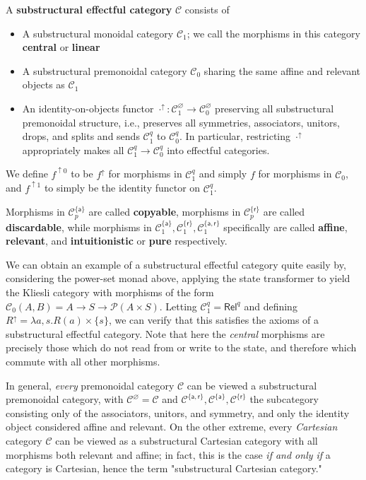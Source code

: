 \documentclass[acmsmall,screen,review]{acmart}
\newcommand{\mc}[1]{\ensuremath{\mathcal{#1}}}
\newcommand{\ms}[1]{\ensuremath{\mathsf{#1}}}
\newcommand{\upg}[2]{{#1}^{\uparrow #2}}
\begin{document}
\begin{definition}
  A \textbf{substructural effectful category} \(\mc{C}\) consists of
  \begin{itemize}
    \item A substructural monoidal category \(\mc{C}_1\); we call the morphisms in this category \textbf{central} or \textbf{linear}
    \item A substructural premonoidal category \(\mc{C}_0\) sharing the same affine and relevant objects as \(\mc{C}_1\)
    \item An identity-on-objects functor \(\upg{\cdot}{}: \mc{C}_1^\varnothing \to \mc{C}_0^\varnothing\) preserving all substructural premonoidal structure, i.e., preserves all symmetries, associators, unitors, drops, and splits and sends \(\mc{C}_1^q\) to \(\mc{C}_0^q\).
    In particular, restricting \(\upg{\cdot}{}\) appropriately makes all \(\mc{C}_1^q \to \mc{C}_0^q\) into effectful categories.
  \end{itemize}
  We define \(\upg{f}{0}\) to be \(\upg{f}{}\) for morphisms in \(\mc{C}_1^q\) and simply \(f\) for morphisms in \(\mc{C}_0\), and \(\upg{f}{1}\) to simply be the identity functor on \(\mc{C}_1^q\).
 
  Morphisms in \(\mc{C}_p^{\{\ms{a}\}}\) are called \textbf{copyable}, morphisms in \(\mc{C}_p^{\{\ms{r}\}}\) are called \textbf{discardable},
  while morphisms in \(\mc{C}_1^{\{\ms{a}\}}, \mc{C}_1^{\{\ms{r}\}}, \mc{C}_1^{\{\ms{a}, \ms{r}\}}\) specifically are called \textbf{affine}, \textbf{relevant}, and \textbf{intuitionistic} or \textbf{pure} respectively.
\end{definition}

We can obtain an example of a substructural effectful category quite easily by, considering the power-set monad above, applying the state transformer to yield the Kliesli category with morphisms of the form \(\mc{C}_0(A, B) = A \to S \to \mc{P}(A \times S)\). Letting \(\mc{C}_1^q = \ms{Rel}^q\) and defining
\(
  \upg{R}{} = \lambda a, s. R(a) \times \{s\}
\), we can verify that this satisfies the axioms of a substructural effectful category.
Note that here the \textit{central} morphisms are precisely those which do not read from or write to the state, and therefore which commute with all other morphisms.

In general, \textit{every} premonoidal category \(\mc{C}\) can be viewed a substructural premonoidal category, with \(\mc{C}^\varnothing = \mc{C}\) and \(\mc{C}^{\{\ms{a}, \ms{r}\}}, \mc{C}^{\{\ms{a}\}}, \mc{C}^{\{\ms{r}\}}\) the subcategory consisting only of the associators, unitors, and symmetry, and only the identity object considered affine and relevant. On the other extreme, every \textit{Cartesian} category \(\mc{C}\) can be viewed as a substructural Cartesian category with all morphisms both relevant and affine; in fact, this is the case \textit{if and only if} a category is Cartesian, hence the term "substructural Cartesian category."
\end{document}
